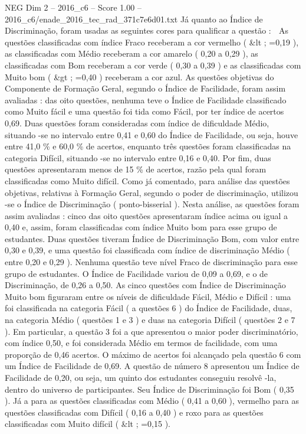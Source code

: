 \begin{textsample}{NEG Dim 2 – 2016\_c6 – Score 1.00 – 2016\_c6/enade\_2016\_tec\_rad\_371c7e6d01.txt}
Já quanto ao Índice de Discriminação, foram usadas as seguintes cores para qualificar a questão :  As questões classificadas com índice Fraco receberam a cor vermelho ( \&lt ; =0,19 ), as classificadas com Médio receberam a cor amarelo ( 0,20 a 0,29 ), as classificadas com Bom receberam a cor verde ( 0,30 a 0,39 ) e as classificadas com Muito bom ( \&gt ; =0,40 ) receberam a cor azul.
As questões objetivas do Componente de Formação Geral, segundo o Índice de Facilidade, foram assim avaliadas : das oito questões, nenhuma teve o Índice de Facilidade classificado como Muito fácil e uma questão foi tida como Fácil, por ter índice de acertos 0,69.
Duas questões foram consideradas com índice de dificuldade Médio, situando -se no intervalo entre 0,41 e 0,60 do Índice de Facilidade, ou seja, houve entre 41,0 \% e 60,0 \% de acertos, enquanto três questões foram classificadas na categoria Difícil, situando -se no intervalo entre 0,16 e 0,40.
Por fim, duas questões apresentaram menos de 15 \% de acertos, razão pela qual foram classificadas como Muito difícil.
Como já comentado, para análise das questões objetivas, relativas à Formação Geral, segundo o poder de discriminação, utilizou -se o Índice de Discriminação ( ponto-bisserial ).
Nesta análise, as questões foram assim avaliadas : cinco das oito questões apresentaram índice acima ou igual a 0,40 e, assim, foram classificadas com índice Muito bom para esse grupo de estudantes.
Duas questões tiveram Índice de Discriminação Bom, com valor entre 0,30 e 0,39, e uma questão foi classificada com índice de discriminação Médio ( entre 0,20 e 0,29 ).
Nenhuma questão teve nível Fraco de discriminação para esse grupo de estudantes.
O Índice de Facilidade variou de 0,09 a 0,69, e o de Discriminação, de 0,26 a 0,50.
As cinco questões com Índice de Discriminação Muito bom figuraram entre os níveis de dificuldade Fácil, Médio e Difícil : uma foi classificada na categoria Fácil ( a questões 6 ) do Índice de Facilidade, duas, na categoria Médio ( questões 1 e 3 ) e duas na categoria Difícil ( questões 2 e 7 ).
Em particular, a questão 3 foi a que apresentou o maior poder discriminatório, com índice 0,50, e foi considerada Médio em termos de facilidade, com uma proporção de 0,46 acertos.
O máximo de acertos foi alcançado pela questão 6 com um Índice de Facilidade de 0,69.
A questão de número 8 apresentou um Índice de Facilidade de 0,20, ou seja, um quinto dos estudantes conseguiu resolvê -la, dentro do universo de participantes.
Seu Índice de Discriminação foi Bom ( 0,35 ).
Já a para as questões classificadas com Médio ( 0,41 a 0,60 ), vermelho para as questões classificadas com Difícil ( 0,16 a 0,40 ) e roxo para as questões classificadas com Muito difícil ( \&lt ; =0,15 ).

\end{textsample}
